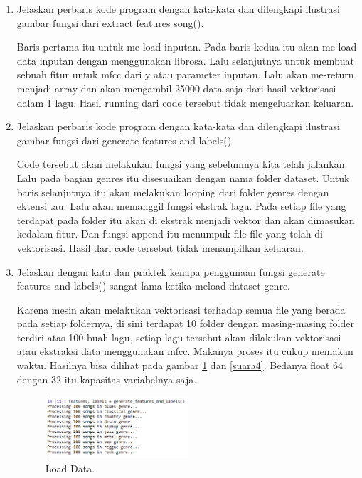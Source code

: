 \begin{enumerate}
\item Jelaskan perbaris kode program dengan kata-kata dan dilengkapi ilustrasi gambar fungsi dari extract features song(). \par

Baris pertama itu untuk me-load inputan. Pada baris kedua itu akan me-load data inputan dengan menggunakan librosa. Lalu selanjutnya untuk membuat sebuah fitur untuk mfcc dari y atau parameter inputan. Lalu akan me-return menjadi array dan akan mengambil 25000 data saja dari hasil vektorisasi dalam 1 lagu.  Hasil running dari code tersebut tidak mengeluarkan keluaran.

\item Jelaskan perbaris kode program dengan kata-kata dan dilengkapi ilustrasi gambar fungsi dari generate features and labels(). \par

Code tersebut akan melakukan fungsi yang sebelumnya kita telah jalankan. Lalu pada bagian genres itu disesuaikan dengan nama folder dataset. Untuk baris selanjutnya itu akan melakukan looping dari folder genres dengan ektensi .au. Lalu akan memanggil fungsi ekstrak lagu. Pada setiap file yang terdapat pada folder itu akan di ekstrak menjadi vektor dan akan dimasukan kedalam fitur. Dan fungsi append itu menumpuk file-file yang telah di vektorisasi. Hasil dari code tersebut tidak menampilkan keluaran.

\item Jelaskan dengan kata dan praktek kenapa penggunaan fungsi generate features and labels() sangat lama ketika meload dataset genre. \par

Karena mesin akan melakukan vektorisasi terhadap semua file yang berada pada setiap foldernya, di sini terdapat 10 folder dengan masing-masing folder terdiri atas 100 buah lagu, setiap lagu tersebut akan dilakukan vektorisasi atau ekstraksi data menggunakan mfcc. Makanya proses itu cukup memakan waktu. Hasilnya bisa dilihat pada gambar \ref{suara3} dan \ref{suara4}. Bedanya float 64 dengan 32 itu kapasitas variabelnya saja.
		\begin{figure}[!htbp]
		\centerline{\includegraphics[width=0.5\textwidth]{figures/im/suara3.png}}
		\caption{Load Data.}
		\label{suara3}
		\end{figure}


\end{enumerate}
